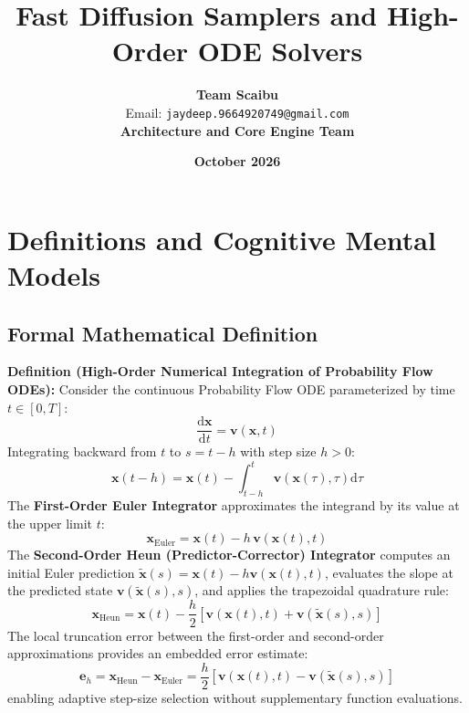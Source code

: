 \documentclass[11pt,a4paper]{article}
\title{\textbf{Fast Diffusion Samplers and High-Order ODE Solvers}}
\author{\textbf{Team Scaibu} \\ \small Email: \texttt{jaydeep.9664920749@gmail.com} \\ \small \textbf{Architecture and Core Engine Team}}
\date{\textbf{October 2026}}
\theoremstyle{definition}
\begin{document}
\maketitle

\section{Definitions and Cognitive Mental Models}

\subsection{Formal Mathematical Definition}
\textbf{Definition (High-Order Numerical Integration of Probability Flow ODEs):}
Consider the continuous Probability Flow ODE parameterized by time $t \in [0, T]$:
{\boldmath
\begin{equation}
\frac{\mathrm{d}\mathbf{x}}{\mathrm{d}t} = \mathbf{v}(\mathbf{x}, t)
\end{equation}
}
Integrating backward from $t$ to $s = t - h$ with step size $h > 0$:
{\boldmath
\begin{equation}
\mathbf{x}(t - h) = \mathbf{x}(t) - \int_{t-h}^t \mathbf{v}(\mathbf{x}(\tau), \tau) \mathrm{d}\tau
\end{equation}
}
The \textbf{First-Order Euler Integrator} approximates the integrand by its value at the upper limit $t$:
{\boldmath
\begin{equation}
\mathbf{x}_{\text{Euler}} = \mathbf{x}(t) - h \, \mathbf{v}(\mathbf{x}(t), t)
\end{equation}
}
The \textbf{Second-Order Heun (Predictor-Corrector) Integrator} computes an initial Euler prediction $\tilde{\mathbf{x}}(s) = \mathbf{x}(t) - h \mathbf{v}(\mathbf{x}(t), t)$, evaluates the slope at the predicted state $\mathbf{v}(\tilde{\mathbf{x}}(s), s)$, and applies the trapezoidal quadrature rule:
{\boldmath
\begin{equation}
\mathbf{x}_{\text{Heun}} = \mathbf{x}(t) - \frac{h}{2} \left[ \mathbf{v}(\mathbf{x}(t), t) + \mathbf{v}(\tilde{\mathbf{x}}(s), s) \right]
\end{equation}
}
The local truncation error between the first-order and second-order approximations provides an embedded error estimate:
{\boldmath
\begin{equation}
\mathbf{e}_h = \mathbf{x}_{\text{Heun}} - \mathbf{x}_{\text{Euler}} = \frac{h}{2} \left[ \mathbf{v}(\mathbf{x}(t), t) - \mathbf{v}(\tilde{\mathbf{x}}(s), s) \right]
\end{equation}
}
enabling adaptive step-size selection without supplementary function evaluations.
\end{document}
